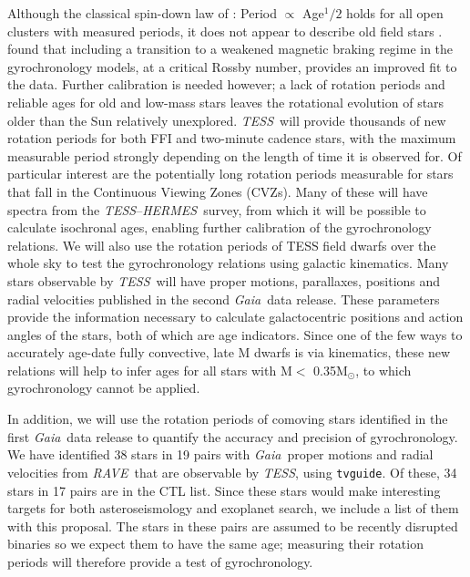 \documentclass[letterpaper,12pt,preprint]{hack_aastex}
\newcommand{\TESS}{{\it TESS}}
\newcommand{\tess}{{\it TESS}}
\newcommand{\Gaia}{{\it Gaia}}
\newcommand{\RAVE}{{\it RAVE}}
\newcommand{\HERMES}{{\it HERMES}}
\begin{document}
Although the classical spin-down law of \citet{skumanich1972}: Period
$\propto$ Age$^1/2$ holds for all open clusters with measured periods, it does
not appear to describe old field stars \citep{angus2015, van-saders2016}.
\citet{van-saders2016} found that including a transition to a weakened magnetic
braking regime in the gyrochronology models, at a critical Rossby number,
provides an improved fit to the data.
Further calibration is needed however; a lack of rotation periods and reliable
ages for old and low-mass stars leaves the rotational evolution of stars older
than the Sun relatively unexplored.
\TESS\ will provide thousands of new rotation periods for both FFI and
two-minute cadence stars, with the maximum measurable period strongly
depending on the length of time it is observed for.
Of particular interest are the potentially long rotation periods measurable
for stars that fall in the Continuous Viewing Zones (CVZs).
Many of these will have spectra from the \TESS --\HERMES\ survey, from which it
will be possible to calculate isochronal ages, enabling further calibration of
the gyrochronology relations.
We will also use the rotation periods of TESS field dwarfs over the whole sky
to test the gyrochronology relations using galactic kinematics.
Many stars observable by \tess\ will have proper motions, parallaxes,
positions and radial velocities published in the second \Gaia\ data release.
These parameters provide the information necessary to calculate galactocentric
positions and action angles of the stars, both of which are age indicators.
Since one of the few ways to accurately age-date fully convective, late M
dwarfs is via kinematics, these new relations will help to infer ages for all
stars with M$<$ 0.35M$_\odot$, to which gyrochronology cannot be applied.

In addition, we will use the rotation periods of comoving stars identified in
the first \Gaia\ data release \citep{oh2016} to quantify the accuracy and
precision of gyrochronology.
We have identified 38 stars in 19 pairs with \Gaia\ proper motions and radial
velocities from \RAVE\ that are observable by \TESS, using {\tt tvguide}.
Of these, 34 stars in 17 pairs are in the CTL list.
Since these stars would make interesting targets for both asteroseismology and
exoplanet search, we include a list of them with this proposal.
The stars in these pairs are assumed to be recently disrupted binaries so we
expect them to have the same age; measuring their rotation periods will
therefore provide a test of gyrochronology.
\end{document}
